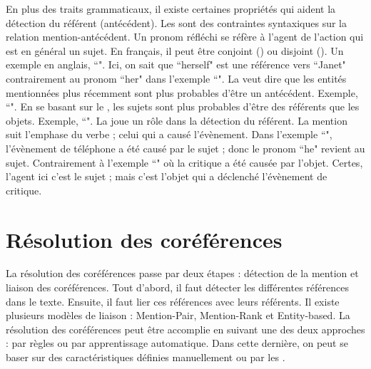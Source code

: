 \documentclass{KodeBook}
\begin{document}
En plus des traits grammaticaux, il existe certaines propriétés qui aident la détection du référent (antécédent).
Les   sont des contraintes syntaxiques sur la relation mention-antécédent.
Un pronom réfléchi se réfère à l'agent de l'action qui est en général un sujet. 
En français, il peut être conjoint () ou disjoint ().
Un exemple en anglais, ``". 
Ici, on sait que ``herself" est une référence vers ``Janet" contrairement au pronom ``her" dans l'exemple ``".
La  veut dire que les entités mentionnées plus récemment sont plus probables d'être un antécédent.
Exemple, ``".
En se basant sur le , les sujets sont plus probables d'être des référents que les objets. 
Exemple, ``".
La  joue un rôle dans la détection du référent. 
La mention suit l'emphase du verbe ; celui qui a causé l'évènement.
Dans l'exemple ``", l'évènement de téléphone a été causé par le sujet ; donc le pronom ``he" revient au sujet. 
Contrairement à l'exemple ``" où la critique a été causée par l'objet. 
Certes, l'agent ici c'est le sujet ; mais c'est l'objet qui a déclenché l'évènement de critique.

\section{Résolution des coréférences}

La résolution des coréférences passe par deux étapes : détection de la mention et liaison des coréférences. 
Tout d'abord, il faut détecter les différentes références dans le texte. 
Ensuite, il faut lier ces références avec leurs référents.
Il existe plusieurs modèles de liaison : Mention-Pair, Mention-Rank et Entity-based.
La résolution des coréférences peut être accomplie en suivant une des deux approches : par règles ou par apprentissage automatique. 
Dans cette dernière, on peut se baser sur des caractéristiques définies manuellement ou par les .
\end{document}
